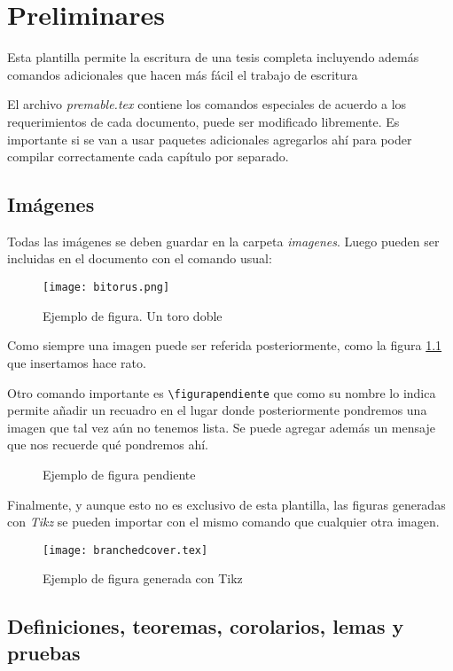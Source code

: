 \documentclass[11pt, twoside]{book}
\begin{document}
\chapter{Preliminares}
Esta plantilla permite la escritura de una tesis completa incluyendo además
comandos adicionales que hacen más fácil el trabajo de escritura

El archivo \textit{premable.tex} contiene los comandos especiales de acuerdo a
los requerimientos de cada documento, puede ser modificado libremente. Es
importante si se van a usar paquetes adicionales agregarlos ahí para poder
compilar correctamente cada capítulo por separado.

\section{Imágenes} \label{sec:imagenes}
Todas las imágenes se deben guardar en la carpeta \textit{imagenes}. Luego
pueden ser incluidas en el documento con el comando usual:

\begin{figure}[ht]
  \centering
  \texttt{[image: bitorus.png]}
  \caption{Ejemplo de figura. Un toro doble}
  \label{fig:dobletoro}
\end{figure}

Como siempre una imagen puede ser referida posteriormente, como la figura
\ref{fig:dobletoro} que insertamos hace rato.

Otro comando importante es \verb|\figurapendiente| que como su nombre lo indica
permite añadir un recuadro en el lugar donde posteriormente pondremos una
imagen que tal vez aún no tenemos lista. Se puede agregar además un mensaje que
nos recuerde qué pondremos ahí.

\begin{figure}[ht]
  \centering
  \caption{Ejemplo de figura pendiente}
  \label{fig:pendiente1}
\end{figure}


Finalmente, y aunque esto no es exclusivo de esta plantilla, las figuras
generadas con \textit{Tikz} se pueden importar con el mismo comando que
cualquier otra imagen.

\begin{figure}[ht]
  \centering
  \texttt{[image: branchedcover.tex]}
  \caption{Ejemplo de figura generada con Tikz}
  \label{fig:tikz1}
\end{figure}


\section{Definiciones, teoremas, corolarios, lemas y pruebas}
\end{document}
